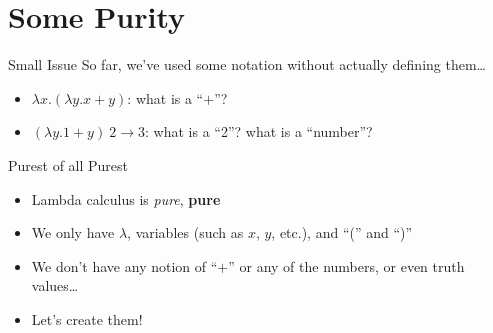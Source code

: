 \documentclass{beamer}
\begin{document}
\section{Some Purity}
\begin{frame}{Small Issue}
  So far, we've used some notation without actually defining them\dots
  \begin{itemize}
    \item $\lambda x.(\lambda y.x+y)$: what is a ``$+$''?
    \item $(\lambda y.1+y)\ 2\to3$: what is a ``2''? what is a ``number''?
  \end{itemize}
\end{frame}
\begin{frame}{Purest of all Purest}
  \begin{itemize}
    \item Lambda calculus is \emph{pure}, \textbf{pure}
    \item We only have $\lambda$, variables (such as $x$, $y$, etc.), and ``('' and ``)''
    \item We don't have any notion of ``$+$'' or any of the numbers, or even truth values\dots
    \item Let's create them!
  \end{itemize}
\end{frame}
\end{document}
